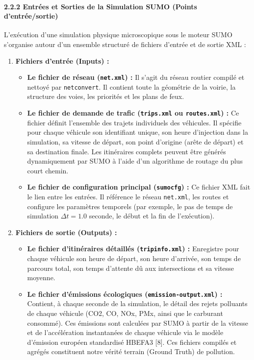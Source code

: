 \documentclass[10pt, a4paper]{article}
\providecommand{\tightlist}{}
\begin{document}
\paragraph{2.2.2 Entrées et Sorties de la Simulation SUMO (Points
d'entrée/sortie)}\label{entruxe9es-et-sorties-de-la-simulation-sumo-points-dentruxe9esortie}

L'exécution d'une simulation physique microscopique sous le moteur SUMO
s'organise autour d'un ensemble structuré de fichiers d'entrée et de
sortie XML :

\begin{enumerate}
\def\labelenumi{\arabic{enumi}.}
\tightlist
\item
  \textbf{Fichiers d'entrée (Inputs) :}

  \begin{itemize}
  \tightlist
  \item
    \textbf{Le fichier de réseau (\texttt{net.xml}) :} Il s'agit du
    réseau routier compilé et nettoyé par \texttt{netconvert}. Il
    contient toute la géométrie de la voirie, la structure des voies,
    les priorités et les plans de feux.
  \item
    \textbf{Le fichier de demande de trafic (\texttt{trips.xml} ou
    \texttt{routes.xml}) :} Ce fichier définit l'ensemble des trajets
    individuels des véhicules. Il spécifie pour chaque véhicule son
    identifiant unique, son heure d'injection dans la simulation, sa
    vitesse de départ, son point d'origine (arête de départ) et sa
    destination finale. Les itinéraires complets peuvent être générés
    dynamiquement par SUMO à l'aide d'un algorithme de routage du plus
    court chemin.
  \item
    \textbf{Le fichier de configuration principal (\texttt{sumocfg}) :}
    Ce fichier XML fait le lien entre les entrées. Il référence le
    réseau \texttt{net.xml}, les routes et configure les paramètres
    temporels (par exemple, le pas de temps de simulation
    \(\Delta t = 1.0\) seconde, le début et la fin de l'exécution).
  \end{itemize}
\item
  \textbf{Fichiers de sortie (Outputs) :}

  \begin{itemize}
  \tightlist
  \item
    \textbf{Le fichier d'itinéraires détaillés (\texttt{tripinfo.xml})
    :} Enregistre pour chaque véhicule son heure de départ, son heure
    d'arrivée, son temps de parcours total, son temps d'attente dû aux
    intersections et sa vitesse moyenne.
  \item
    \textbf{Le fichier d'émissions écologiques
    (\texttt{emission-output.xml}) :} Contient, à chaque seconde de la
    simulation, le détail des rejets polluants de chaque véhicule (CO2,
    CO, NOx, PMx, ainsi que le carburant consommé). Ces émissions sont
    calculées par SUMO à partir de la vitesse et de l'accélération
    instantanées de chaque véhicule via le modèle d'émission européen
    standardisé HBEFA3 {[}8{]}. Ces fichiers compilés et agrégés
    constituent notre vérité terrain (Ground Truth) de pollution.
  \end{itemize}
\end{enumerate}
\end{document}
